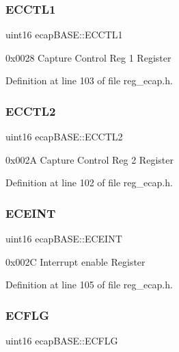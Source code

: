 \subsubsection{\texorpdfstring{E\+C\+C\+T\+L1}{ECCTL1}}
{\footnotesize\ttfamily uint16 ecap\+B\+A\+S\+E\+::\+E\+C\+C\+T\+L1}

0x0028 Capture Control Reg 1 Register 

Definition at line 103 of file reg\+\_\+ecap.\+h.

\mbox{\label{structecapBASE_a32f049b17a2f2c280ccffe6277d6b48c}} 
\subsubsection{\texorpdfstring{E\+C\+C\+T\+L2}{ECCTL2}}
{\footnotesize\ttfamily uint16 ecap\+B\+A\+S\+E\+::\+E\+C\+C\+T\+L2}

0x002A Capture Control Reg 2 Register 

Definition at line 102 of file reg\+\_\+ecap.\+h.

\mbox{\label{structecapBASE_a74012d8211945e6c7d7e735a801daa52}} 
\subsubsection{\texorpdfstring{E\+C\+E\+I\+NT}{ECEINT}}
{\footnotesize\ttfamily uint16 ecap\+B\+A\+S\+E\+::\+E\+C\+E\+I\+NT}

0x002C Interrupt enable Register 

Definition at line 105 of file reg\+\_\+ecap.\+h.

\mbox{\label{structecapBASE_ab9e1c5e3ba6bf7ce54365b0cc33beeb0}} 
\subsubsection{\texorpdfstring{E\+C\+F\+LG}{ECFLG}}
{\footnotesize\ttfamily uint16 ecap\+B\+A\+S\+E\+::\+E\+C\+F\+LG}

